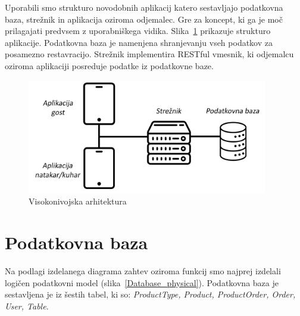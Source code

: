 \documentclass[a4paper, 12pt]{book}
\begin{document}
Uporabili smo strukturo novodobnih aplikacij katero sestavljajo podatkovna baza, strežnik in aplikacija oziroma odjemalec. Gre za koncept, ki ga je moč prilagajati predvsem z uporabniškega vidika. Slika~\ref{StrukApk} prikazuje strukturo aplikacije.
Podatkovna baza je namenjena shranjevanju vseh podatkov za posamezno restavracijo. Strežnik implementira RESTful vmesnik, ki odjemalcu oziroma aplikaciji posreduje podatke iz podatkovne baze. 

\begin{figure}[!htb]
\centering
\includegraphics[width=10.5cm]{Skica1-new.png}
\caption{Visokonivojska arhitektura}
\label{StrukApk}
\end{figure}



\section{Podatkovna baza}
Na podlagi izdelanega diagrama zahtev oziroma funkcij smo najprej izdelali logičen podatkovni model (slika~\ref{Database_physical}). Podatkovna baza je sestavljena je iz šestih tabel, ki so: \textit{ProductType, Product, ProductOrder, Order, User, Table}. 
\end{document}
